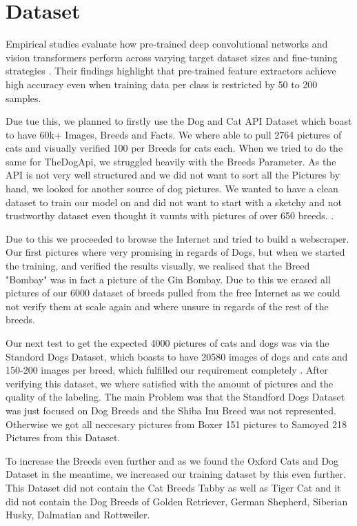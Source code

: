 \section{Dataset}
\label{sec:dataset}

Empirical studies evaluate how pre-trained deep 
convolutional networks and vision transformers 
perform across varying target dataset sizes and 
fine-tuning strategies \cite{aboubaker2022empirical}. 
Their findings highlight that pre-trained feature 
extractors achieve high accuracy even when training 
data per class is restricted by 50 to 200 samples.

Due tue this, we planned to firstly use the Dog and 
Cat API Dataset \cite{cat_api} which boast to have 60k+ Images, Breeds and Facts. We where able to pull 2764 pictures of cats and visually verified 100 per Breeds for cats each. When we tried to do the same for TheDogApi, we struggled heavily with the Breeds Parameter. 
As the API is not very well structured and we did not want to sort all the Pictures by hand, we looked for another source of dog pictures. We wanted to have a clean dataset to train our model on and did not want to start with a sketchy and not trustworthy dataset even thought it vaunts with pictures of over 650 breeds.
\cite{thedogapi}.

Due to this we proceeded to browse the Internet and tried to build a webscraper. Our first pictures where very promising in regards of Dogs, but when we started the training, 
and verified the results visually, we realised that the Breed "Bombay" was in fact a picture of the Gin Bombay. Due to this we erased all pictures of our 6000 dataset of breeds pulled from the free Internet as we could not verify them at scale again and where unsure in regards of the rest of the breeds.

Our next test to get the expected 4000 pictures of cats and dogs was via the Standord Dogs Dataset, which boasts to have 20580 images of dogs and cats and 150-200 images per breed, which fulfilled our requirement completely \cite{khosla2011stanford}. After verifying this dataset, we where satisfied with the amount of pictures and the quality of the labeling. The main Problem was that the Standford Dogs Dataset was just focused on Dog Breeds and the Shiba Inu Breed was not represented. Otherwise we got all neccesary pictures from Boxer 151 pictures to Samoyed 218 Pictures 
from this Dataset. 
 
To increase the Breeds even further and as we found the Oxford Cats and Dog Dataset in the meantime, we increased our training dataset by this even further.
This Dataset did not contain the Cat Breeds Tabby as well as Tiger Cat and it did not contain the Dog Breeds of Golden Retriever, German Shepherd, Siberian Husky, Dalmatian and Rottweiler.

